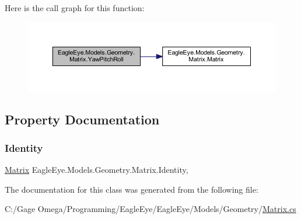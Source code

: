 Here is the call graph for this function\+:\nopagebreak
\begin{figure}[H]
\begin{center}
\leavevmode
\includegraphics[width=350pt]{class_eagle_eye_1_1_models_1_1_geometry_1_1_matrix_a7d060933c0b5d60c2cc161a21555515e_cgraph}
\end{center}
\end{figure}


\subsection{Property Documentation}
\mbox{\label{class_eagle_eye_1_1_models_1_1_geometry_1_1_matrix_a13de6eaef457ac2295454d66c87b2a3b}} 
\subsubsection{\texorpdfstring{Identity}{Identity}}
{\footnotesize\ttfamily \mbox{\hyperlink{class_eagle_eye_1_1_models_1_1_geometry_1_1_matrix}{Matrix}} Eagle\+Eye.\+Models.\+Geometry.\+Matrix.\+Identity\hspace{0.3cm}{\ttfamily [static]}, {\ttfamily [get]}}



The documentation for this class was generated from the following file\+:\begin{DoxyCompactItemize}
\item 
C\+:/\+Gage Omega/\+Programming/\+Eagle\+Eye/\+Eagle\+Eye/\+Models/\+Geometry/\mbox{\hyperlink{_matrix_8cs}{Matrix.\+cs}}\end{DoxyCompactItemize}
